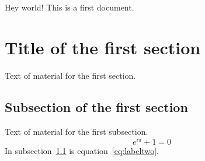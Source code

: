 \documentclass{article}
\begin{document}
Hey world!
This is a first document.
\section{Title of the first section}
Text of material for the first section.
\subsection{Subsection of the first section}
\label{subsec:labelone}
Text of material for the first subsection.
\begin{equation}
e^{i\pi}+1 = 0
\label{eq:labeltwo}
\end{equation}
In subsection~\ref{subsec:labelone} is
equation~\ref{eq:labeltwo}.
\end{document}
